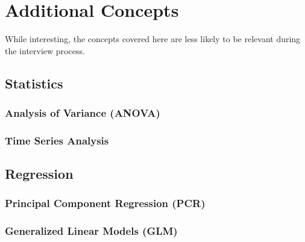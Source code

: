 \chapter{Additional Concepts}
\label{additional}

While interesting, the concepts covered here are less likely
to be relevant during the interview process.

\section{Statistics}
\label{additional:stats}

\subsection{Analysis of Variance (ANOVA)}
\label{additional:stats:ANOVA}

\subsection{Time Series Analysis}
\label{additional:stats:time_series_ana}

\section{Regression}
\label{additional:Regression}

\subsection{Principal Component Regression (PCR)}
\label{additional:Regression:PCR}

\subsection{Generalized Linear Models (GLM)}
\label{additional:Regression:GLM}

